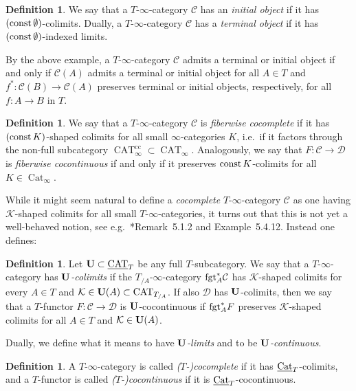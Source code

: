 \documentclass[reqno]{memo-l}
\theoremstyle{mythm}
\theoremstyle{definition}
\newtheorem{definition}[thm]{Definition}
\numberwithin{equation}{section}
\newcommand{\Cc}{{\mathcal{C}}}
\newcommand{\Dd}{{\mathcal{D}}}
\newcommand{\Kk}{{\mathcal{K}}}
\DeclareMathOperator{\Cat}{Cat}
\DeclareMathOperator{\CAT}{CAT}
\newcommand{\cat}[1]{\textbf{\textup{#1}}}
\newcommand{\const}{\textup{const}}
\newcommand{\fgt}{\textup{fgt}}
\newcommand{\ulhelper}[2]{\underline{\setbox0=\hbox{$#1#2$}\dp0=0.4pt \box0\relax}}
\newcommand{\ul}[1]{{\mathpalette\ulhelper{#1}}\hbox{\rule[-2pt]{0pt}{0pt}}}
\begin{document}
\begin{definition}
    We say that a $T$-$\infty$-category $\mathcal C$ has an \emph{initial object} if it has $(\const\,{\emptyset})$-colimits. 
    Dually, a $T$-$\infty$-category $\mathcal C$ has a \emph{terminal object} if it has $(\const\,{\emptyset})$-indexed limits. 
\end{definition}

By the above example, a $T$-$\infty$-category $\Cc$ admits a terminal or initial object if and only if $\mathcal C(A)$ admits a terminal or initial object for all $A\in T$ and $f^*\colon\mathcal C(B)\to\mathcal C(A)$ preserves terminal or initial objects, respectively, for all $f\colon A\to B$ in $T$. 

\begin{definition}\label{defi:fiberwise-colims}
    We say that a $T$-$\infty$-category $\Cc$ is \emph{fiberwise cocomplete} if it has $(\const\,K)$-shaped colimits for all small $\infty$-categories $K$, i.e.\ if it factors through the non-full subcategory $\CAT_\infty^\text{cc}\subset\CAT_\infty$. Analogously, we say that $F\colon\Cc\to\Dd$ is \emph{fiberwise cocontinuous} if and only if it preserves $\const\,K$-colimits for all $K\in\Cat_\infty$.
\end{definition}

While it might seem natural to define a \emph{cocomplete} $T$-$\infty$-category $\Cc$ as one having $\Kk$-shaped colimits for all small $T$-$\infty$-categories, it turns out that this is not yet a well-behaved notion, see e.g.\ \cite{martiniwolf2021limits}*{Remark~5.1.2 and Example~5.4.12}. Instead one defines:

\begin{definition}
    Let $\cat{U}\subset\ul\CAT_T$ be any full $T$-subcategory. We say that a $T$-$\infty$-category has \emph{$\cat{U}$-colimits} if the $T_{/A}$-$\infty$-category $\fgt_A^*\Cc$ has $\Kk$-shaped colimits for every $A\in T$ and $\Kk\in\cat{U}(A)\subset\CAT_{T_{/A}}$. If also $\Dd$ has $\cat{U}$-colimits, then we say that a $T$-functor $F\colon\Cc\to\Dd$ is $\cat{U}$-cocontinuous if $\fgt_A^*F$ preserves $\Kk$-shaped colimits for all $A\in T$ and $\Kk\in\cat{U}(A)$.

    Dually, we define what it means to have \emph{$\cat{U}$-limits} and to be \emph{$\cat{U}$-continuous}.
\end{definition}

\begin{definition}\label{defi:T-cc}
    A $T$-$\infty$-category is called \emph{(\kern1pt$T$-)cocomplete} if it has $\ul\Cat_T$-colimits, and a $T$-functor is called \emph{(\kern1pt$T$-)cocontinuous} if it is $\ul\Cat_T$-cocontinuous.
\end{definition}
\end{document}
